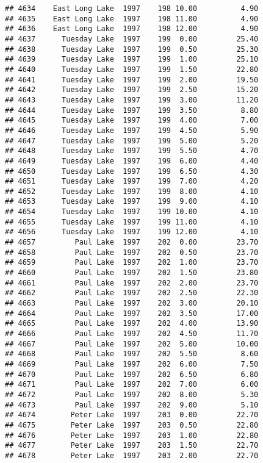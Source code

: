 \documentclass[
]{article}
\begin{document}
\begin{verbatim}
## 4634    East Long Lake  1997    198 10.00          4.90
## 4635    East Long Lake  1997    198 11.00          4.90
## 4636    East Long Lake  1997    198 12.00          4.90
## 4637      Tuesday Lake  1997    199  0.00         25.40
## 4638      Tuesday Lake  1997    199  0.50         25.30
## 4639      Tuesday Lake  1997    199  1.00         25.10
## 4640      Tuesday Lake  1997    199  1.50         22.80
## 4641      Tuesday Lake  1997    199  2.00         19.50
## 4642      Tuesday Lake  1997    199  2.50         15.20
## 4643      Tuesday Lake  1997    199  3.00         11.20
## 4644      Tuesday Lake  1997    199  3.50          8.80
## 4645      Tuesday Lake  1997    199  4.00          7.00
## 4646      Tuesday Lake  1997    199  4.50          5.90
## 4647      Tuesday Lake  1997    199  5.00          5.20
## 4648      Tuesday Lake  1997    199  5.50          4.70
## 4649      Tuesday Lake  1997    199  6.00          4.40
## 4650      Tuesday Lake  1997    199  6.50          4.30
## 4651      Tuesday Lake  1997    199  7.00          4.20
## 4652      Tuesday Lake  1997    199  8.00          4.10
## 4653      Tuesday Lake  1997    199  9.00          4.10
## 4654      Tuesday Lake  1997    199 10.00          4.10
## 4655      Tuesday Lake  1997    199 11.00          4.10
## 4656      Tuesday Lake  1997    199 12.00          4.10
## 4657         Paul Lake  1997    202  0.00         23.70
## 4658         Paul Lake  1997    202  0.50         23.70
## 4659         Paul Lake  1997    202  1.00         23.70
## 4660         Paul Lake  1997    202  1.50         23.80
## 4661         Paul Lake  1997    202  2.00         23.70
## 4662         Paul Lake  1997    202  2.50         22.30
## 4663         Paul Lake  1997    202  3.00         20.10
## 4664         Paul Lake  1997    202  3.50         17.00
## 4665         Paul Lake  1997    202  4.00         13.90
## 4666         Paul Lake  1997    202  4.50         11.70
## 4667         Paul Lake  1997    202  5.00         10.00
## 4668         Paul Lake  1997    202  5.50          8.60
## 4669         Paul Lake  1997    202  6.00          7.50
## 4670         Paul Lake  1997    202  6.50          6.80
## 4671         Paul Lake  1997    202  7.00          6.00
## 4672         Paul Lake  1997    202  8.00          5.30
## 4673         Paul Lake  1997    202  9.00          5.10
## 4674        Peter Lake  1997    203  0.00         22.70
## 4675        Peter Lake  1997    203  0.50         22.80
## 4676        Peter Lake  1997    203  1.00         22.80
## 4677        Peter Lake  1997    203  1.50         22.70
## 4678        Peter Lake  1997    203  2.00         22.70

\end{verbatim}
\end{document}
